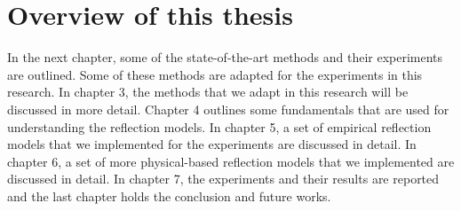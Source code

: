 \section{Overview of this thesis}
In the next chapter, some of the state-of-the-art methods and their experiments are outlined. Some of these methods are adapted for the experiments in this research. In chapter 3, the methods that we adapt in this research will be discussed in more detail. Chapter 4 outlines some fundamentals that are used for understanding the reflection models. In chapter 5, a set of empirical reflection models that we implemented for the experiments are discussed in detail. In chapter 6, a set of more physical-based reflection models that we implemented are discussed in detail. In chapter 7, the experiments and their results are reported and the last chapter holds the conclusion and future works.

